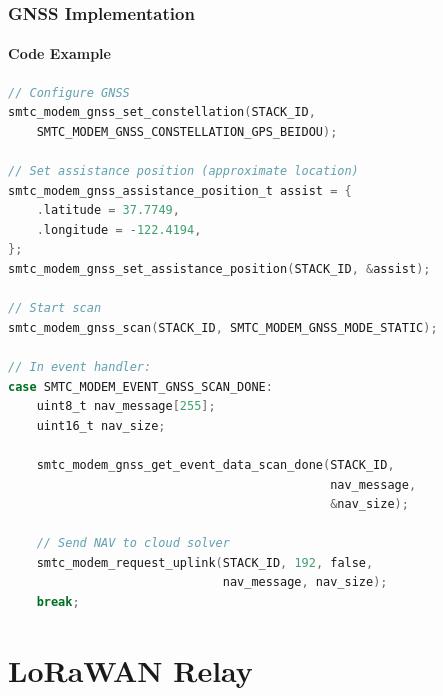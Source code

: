 \documentclass{beamer}
\begin{document}
\begin{frame}[fragile]
\frametitle{GNSS Implementation}
\framesubtitle{Code Example}

\begin{lstlisting}[language=C, basicstyle=\tiny\ttfamily]
// Configure GNSS
smtc_modem_gnss_set_constellation(STACK_ID,
    SMTC_MODEM_GNSS_CONSTELLATION_GPS_BEIDOU);

// Set assistance position (approximate location)
smtc_modem_gnss_assistance_position_t assist = {
    .latitude = 37.7749,
    .longitude = -122.4194,
};
smtc_modem_gnss_set_assistance_position(STACK_ID, &assist);

// Start scan
smtc_modem_gnss_scan(STACK_ID, SMTC_MODEM_GNSS_MODE_STATIC);

// In event handler:
case SMTC_MODEM_EVENT_GNSS_SCAN_DONE:
    uint8_t nav_message[255];
    uint16_t nav_size;

    smtc_modem_gnss_get_event_data_scan_done(STACK_ID,
                                             nav_message,
                                             &nav_size);

    // Send NAV to cloud solver
    smtc_modem_request_uplink(STACK_ID, 192, false,
                              nav_message, nav_size);
    break;
\end{lstlisting}
\end{frame}

\section{LoRaWAN Relay}
\end{document}
